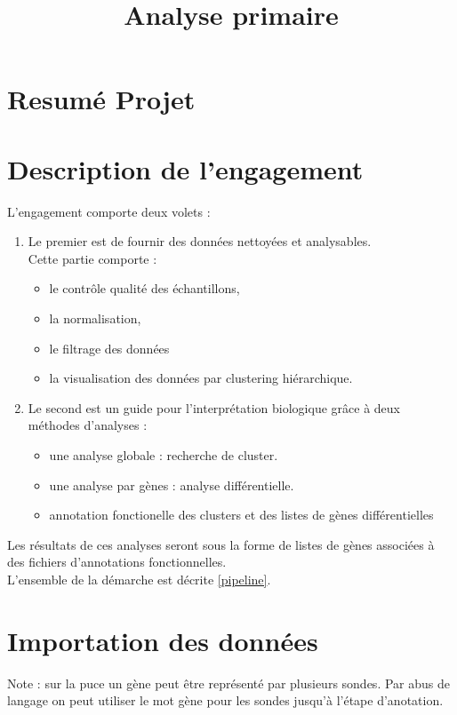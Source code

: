 \documentclass[a4paper]{article}
\title{Analyse primaire}
\author{\bsc{Plateforme BioInformatique de Nantes}}
\begin{document}
\maketitle

\section*{Resumé Projet}

\section*{Description de l'engagement}
L'engagement comporte deux volets :
\begin{enumerate}
	\item Le premier est de fournir des données nettoyées et analysables. 
	\\ Cette partie comporte : 
	\begin{itemize}
		\item le contrôle qualité des échantillons, 
		\item la normalisation, 
		\item le filtrage des données 
		\item la visualisation des données par clustering hiérarchique. 
	\end{itemize}
	\item Le second est un guide pour l'interprétation biologique grâce à deux méthodes d'analyses :
	\begin{itemize}
		\item une analyse globale : recherche de cluster. 
		\item une analyse par gènes : analyse différentielle.
		\item annotation fonctionelle des clusters et des listes de gènes différentielles
	\end{itemize}
\end{enumerate}
 Les résultats de ces analyses seront sous la forme de listes de gènes associées à des fichiers d'annotations fonctionnelles. 
\\
L'ensemble de la démarche est décrite \ref{pipeline}.



\section*{Importation des données}



Note : sur la puce un gène peut être représenté par plusieurs sondes. Par abus de langage on peut utiliser le mot gène pour les sondes jusqu'à l'étape d'anotation.
\\
%
\end{document}
